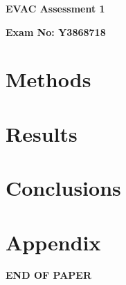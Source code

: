 \documentclass[12pt]{article}
\begin{document}
\setlength{\abovedisplayskip}{2pt}
\setlength{\belowdisplayskip}{2pt}
\setlength{\abovedisplayshortskip}{2pt}
\setlength{\belowdisplayshortskip}{2pt}

\begin{titlepage}
\begin{center}
\vspace*{1cm}
\Huge
\textbf{EVAC Assessment 1}
\vspace{1.5cm}
\Large

\textbf{Exam No: Y3868718}
\vfill
\end{center}
\end{titlepage}
\section{Methods}

\section{Results}

\section{Conclusions}

\pagebreak
\printbibliography
\pagebreak
\section*{Appendix}


\begin{center}

\Large
\textbf{END OF PAPER}

\end{center}
\end{document}
